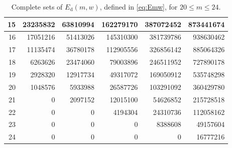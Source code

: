 \documentclass[journal, twocol]{IEEEtran}
\newcommand{\Ed}{{E_{\text{d}}}}
\begin{document}
\begin{table}
\begin{tabular}{|@{\hskip.08cm}r@{\hskip.08cm}||@{\hskip.08cm}r@{\hskip.08cm}|@{\hskip.08cm}r@{\hskip.08cm}|@{\hskip.08cm}r@{\hskip.08cm}|@{\hskip.08cm}r@{\hskip.08cm}|@{\hskip.08cm}r@{\hskip.08cm}|}
15 & 23235832 & 63810994 & 162279170 & 387072452 & 873441674\\\hline
16 & 17051216 & 51413026 & 145310300 & 381739786 & 938630462\\\hline
17 & 11135474 & 36780178 & 112905556 & 326856142 & 885064326\\\hline
18 & 6263626  & 23474060 & 79003896  & 246511952 & 727890178\\\hline
19 & 2928320  & 12917734 & 49317072  & 169050912 & 535748298\\\hline
20 & 1048576  & 5933988  & 26587726  & 103291092 & 360429780\\\hline
21 & 0        & 2097152  & 12015100  & 54626852  & 215728518\\\hline
22 & 0        & 0        & 4194304   & 24310736  & 112058162\\\hline
23 & 0        & 0        & 0         & 8388608   & 49157604\\\hline
24 & 0        & 0        & 0         & 0         & 16777216 \\\hline

\end{tabular}
\caption{Complete sets of $\Ed(m,w)$, defined in \eqref{eq:Emw}, for $20\leq m \leq 24$.}
\label{t:emwc}
\end{table}
\end{document}
